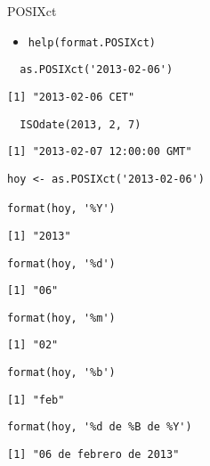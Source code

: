 \documentclass[xcolor={usenames,svgnames,dvipsnames}]{beamer}
\begin{document}
\begin{frame}[fragile,label=sec-2-3]{POSIXct}
 \begin{itemize}
\item \texttt{help(format.POSIXct)}
\end{itemize}
\lstset{language=R,label= ,caption= ,numbers=none}
\begin{lstlisting}
  as.POSIXct('2013-02-06')
\end{lstlisting}

\begin{verbatim}
[1] "2013-02-06 CET"
\end{verbatim}

\lstset{language=R,label= ,caption= ,numbers=none}
\begin{lstlisting}
  ISOdate(2013, 2, 7)
\end{lstlisting}

\begin{verbatim}
[1] "2013-02-07 12:00:00 GMT"
\end{verbatim}

\lstset{language=R,label= ,caption= ,numbers=none}
\begin{lstlisting}
hoy <- as.POSIXct('2013-02-06')

format(hoy, '%Y')
\end{lstlisting}

\begin{verbatim}
[1] "2013"
\end{verbatim}

\lstset{language=R,label= ,caption= ,numbers=none}
\begin{lstlisting}
format(hoy, '%d')
\end{lstlisting}

\begin{verbatim}
[1] "06"
\end{verbatim}

\lstset{language=R,label= ,caption= ,numbers=none}
\begin{lstlisting}
format(hoy, '%m')
\end{lstlisting}

\begin{verbatim}
[1] "02"
\end{verbatim}

\lstset{language=R,label= ,caption= ,numbers=none}
\begin{lstlisting}
format(hoy, '%b')
\end{lstlisting}

\begin{verbatim}
[1] "feb"
\end{verbatim}

\lstset{language=R,label= ,caption= ,numbers=none}
\begin{lstlisting}
format(hoy, '%d de %B de %Y')
\end{lstlisting}

\begin{verbatim}
[1] "06 de febrero de 2013"
\end{verbatim}
\end{frame}
\end{document}
